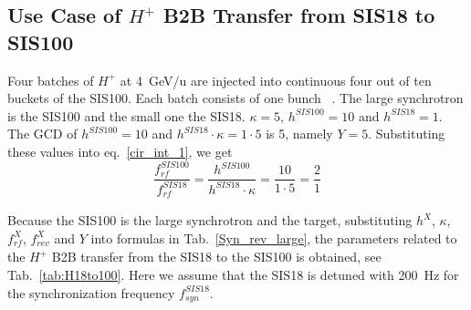 %
%
\subsection{Use Case of $H^{+}$ B2B Transfer from SIS18 to SIS100}
\label{sec:cir_no_int1}
Four batches of $H^{+}$ at \SI{4}{GeV/\atomicmassunit} are injected into continuous four out of ten buckets of the SIS100. Each batch consists of one bunch ~\cite{liebermann_fair_2013, liebermann_sis100_2013}. The large synchrotron is the SIS100 and the small one the SIS18. $\kappa=5$, $h^{\mathit{SIS100}}=10$ and $h^{\mathit{SIS18}}=1$. The GCD of $h^{\mathit{SIS100}}=10$ and $h^{\mathit{SIS18}} \cdot \kappa=1\cdot 5$ is 5, namely $Y=5$. Substituting these values into eq.~\ref{cir_int_1}, we get
\begin{equation}
\frac{f_{\mathit{rf}}^{\mathit{SIS100}}}{f_{\mathit{rf}}^{\mathit{SIS18}}}= \frac {h^{\mathit{SIS100}}}{h^{\mathit{SIS18}} \cdot \kappa}= \frac{10}{1 \cdot 5}=\frac{2}{1}
\end{equation}

Because the SIS100 is the large synchrotron and the target, substituting $h^X$, $\kappa$, $f_{\mathit{rf}}^{X}$, $f_{\mathit{rev}}^{X}$ and $Y$ into formulas in Tab.~\ref{Syn_rev_large}, the parameters related to the $H^{+}$ B2B transfer from the SIS18 to the SIS100 is obtained, see Tab.~\ref{tab:H18to100}. Here we assume that the SIS18 is detuned with \SI{200}{Hz} for the synchronization frequency $f_{\mathit{syn}}^{\mathit{SIS18}}$. 

